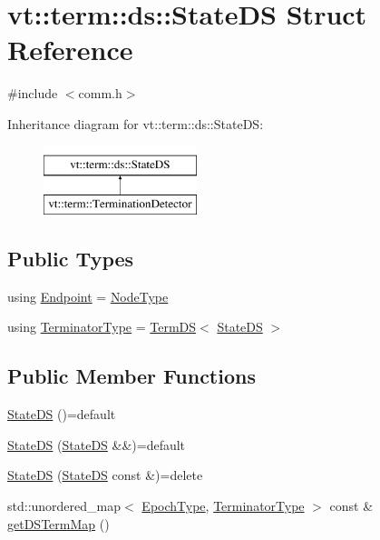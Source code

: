 \hypertarget{structvt_1_1term_1_1ds_1_1_state_d_s}{}\section{vt\+:\+:term\+:\+:ds\+:\+:State\+DS Struct Reference}
\label{structvt_1_1term_1_1ds_1_1_state_d_s}


{\ttfamily \#include $<$comm.\+h$>$}

Inheritance diagram for vt\+:\+:term\+:\+:ds\+:\+:State\+DS\+:\begin{figure}[H]
\begin{center}
\leavevmode
\includegraphics[height=2.000000cm]{structvt_1_1term_1_1ds_1_1_state_d_s}
\end{center}
\end{figure}
\subsection*{Public Types}
\begin{DoxyCompactItemize}
\item 
using \hyperlink{structvt_1_1term_1_1ds_1_1_state_d_s_aba302de614dd639f5d93f4f5b6dd6108}{Endpoint} = \hyperlink{namespacevt_a866da9d0efc19c0a1ce79e9e492f47e2}{Node\+Type}
\item 
using \hyperlink{structvt_1_1term_1_1ds_1_1_state_d_s_af98cfe31c25f710273ee103026d538e4}{Terminator\+Type} = \hyperlink{structvt_1_1term_1_1ds_1_1_term_d_s}{Term\+DS}$<$ \hyperlink{structvt_1_1term_1_1ds_1_1_state_d_s}{State\+DS} $>$
\end{DoxyCompactItemize}
\subsection*{Public Member Functions}
\begin{DoxyCompactItemize}
\item 
\hyperlink{structvt_1_1term_1_1ds_1_1_state_d_s_a8b90d70734aebbe6cbea49fa8fc713f2}{State\+DS} ()=default
\item 
\hyperlink{structvt_1_1term_1_1ds_1_1_state_d_s_aa84d97ee4f2f52142bddb1ec2238a722}{State\+DS} (\hyperlink{structvt_1_1term_1_1ds_1_1_state_d_s}{State\+DS} \&\&)=default
\item 
\hyperlink{structvt_1_1term_1_1ds_1_1_state_d_s_a83663b5cf3c5cc43eaa8bb0bd5edee31}{State\+DS} (\hyperlink{structvt_1_1term_1_1ds_1_1_state_d_s}{State\+DS} const \&)=delete
\item 
std\+::unordered\+\_\+map$<$ \hyperlink{namespacevt_a985a5adf291c34a3ca263b3378388236}{Epoch\+Type}, \hyperlink{structvt_1_1term_1_1ds_1_1_state_d_s_af98cfe31c25f710273ee103026d538e4}{Terminator\+Type} $>$ const  \& \hyperlink{structvt_1_1term_1_1ds_1_1_state_d_s_ac016de8bc9946fdf5386ff17b0ee3ab6}{get\+D\+S\+Term\+Map} ()
\end{DoxyCompactItemize}
